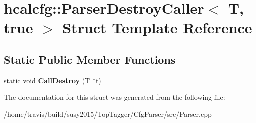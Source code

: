 \hypertarget{structhcalcfg_1_1ParserDestroyCaller_3_01T_00_01true_01_4}{\section{hcalcfg\-:\-:Parser\-Destroy\-Caller$<$ T, true $>$ Struct Template Reference}
\label{structhcalcfg_1_1ParserDestroyCaller_3_01T_00_01true_01_4}
}
\subsection*{Static Public Member Functions}
\begin{DoxyCompactItemize}
\item 
\hypertarget{structhcalcfg_1_1ParserDestroyCaller_3_01T_00_01true_01_4_a5e154cf10500ccf96696697c6aafe244}{static void {\bfseries Call\-Destroy} (T $\ast$t)}\label{structhcalcfg_1_1ParserDestroyCaller_3_01T_00_01true_01_4_a5e154cf10500ccf96696697c6aafe244}

\end{DoxyCompactItemize}


The documentation for this struct was generated from the following file\-:\begin{DoxyCompactItemize}
\item 
/home/travis/build/susy2015/\-Top\-Tagger/\-Cfg\-Parser/src/Parser.\-cpp\end{DoxyCompactItemize}
